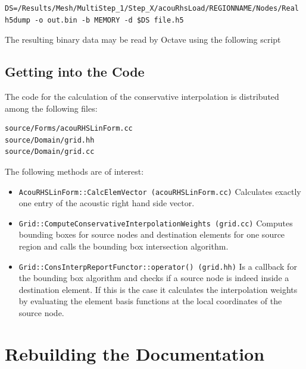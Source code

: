 \documentclass[a4paper,10pt]{article}
\begin{document}
\begin{verbatim}
DS=/Results/Mesh/MultiStep_1/Step_X/acouRhsLoad/REGIONNAME/Nodes/Real
h5dump -o out.bin -b MEMORY -d $DS file.h5
\end{verbatim}

\noindent The resulting binary data may  be read by Octave using the following
script


\subsection{Getting into the Code}

The code for the calculation  of the conservative interpolation is distributed
among the following files:
\begin{verbatim}
source/Forms/acouRHSLinForm.cc
source/Domain/grid.hh
source/Domain/grid.cc
\end{verbatim}
The following methods are of interest:
\begin{itemize}

\item  {\tt   AcouRHSLinForm::CalcElemVector  (acouRHSLinForm.cc)}  Calculates
exactly one entry of the acoustic right hand side vector.

\item  {\tt Grid::ComputeConservativeInterpolationWeights  (grid.cc)} Computes
bounding boxes for source nodes and destination elements for one source region
and calls the bounding box intersection algorithm.

\item {\tt Grid::ConsInterpReportFunctor::operator()  (grid.hh)} Is a callback
for the bounding box algorithm and checks  if a source node is indeed inside a
destination  element. If  this is  the  case it  calculates the  interpolation
weights by evaluating the element  basis functions at the local coordinates of
the source node.

\end{itemize}

\newpage
\section{Rebuilding the Documentation}
\end{document}
